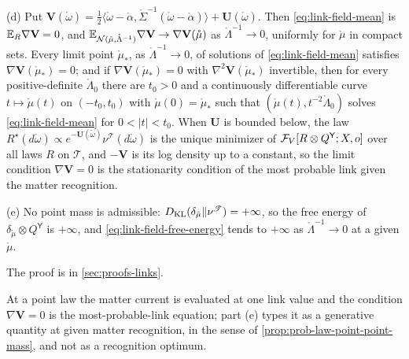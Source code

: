 (d) Put
$\mathbf V(\mathring\omega)=\frac12\langle\mathring\omega-\mathring\alpha,\mathring\Sigma^{-1}(\mathring\omega-\mathring\alpha)\rangle+\mathbf U(\mathring\omega)$.
Then \eqref{eq:link-field-mean} is $\mathbb E_R\nabla\mathbf V=0$, and
$\mathbb E_{\mathcal N(\mathring\mu,\mathring\Lambda^{-1})}\nabla\mathbf V\to\nabla\mathbf V(\mathring\mu)$ as
$\mathring\Lambda^{-1}\to0$, uniformly for $\mathring\mu$ in compact sets. Every limit point $\mathring\mu_*$, as
$\mathring\Lambda^{-1}\to0$, of solutions of \eqref{eq:link-field-mean} satisfies $\nabla\mathbf V(\mathring\mu_*)=0$;
and if $\nabla\mathbf V(\mathring\mu_*)=0$ with $\nabla^2\mathbf V(\mathring\mu_*)$ invertible, then for every
positive-definite $\mathring\Lambda_0$ there are $t_0>0$ and a continuously differentiable curve
$t\mapsto\mathring\mu(t)$ on $(-t_0,t_0)$ with $\mathring\mu(0)=\mathring\mu_*$ such that
$(\mathring\mu(t),t^{-2}\mathring\Lambda_0)$ solves \eqref{eq:link-field-mean} for $0<\lvert t\rvert<t_0$. When
$\mathbf U$ is bounded below, the law
$R^\star(d\mathring\omega)\propto e^{-\mathbf U(\mathring\omega)}\nu^{\mathscr T}(d\mathring\omega)$ is the
unique minimizer of $\mathcal F_V[R\otimes Q^{\mathsf Y};X,o]$ over all laws $R$ on $\mathscr T$, and $-\mathbf V$ is
its log density up to a constant, so the limit condition $\nabla\mathbf V=0$ is the stationarity condition
of the most probable link given the matter recognition.

(e) No point mass is admissible: $D_{\mathrm{KL}}(\delta_{\mathring\mu}\Vert\nu^{\mathscr T})=+\infty$, so the free
energy of $\delta_{\mathring\mu}\otimes Q^{\mathsf Y}$ is $+\infty$, and \eqref{eq:link-field-free-energy} tends
to $+\infty$ as $\mathring\Lambda^{-1}\to0$ at a given $\mathring\mu$. 

The proof is in \cref{sec:proofs-links}.

At a point law the matter current is evaluated at one link value and the condition $\nabla\mathbf V=0$ is the
most-probable-link equation; part (e) types it as a generative quantity at given matter recognition, in
the sense of \cref{prop:prob-law-point-point-mass}, and not as a recognition optimum.

